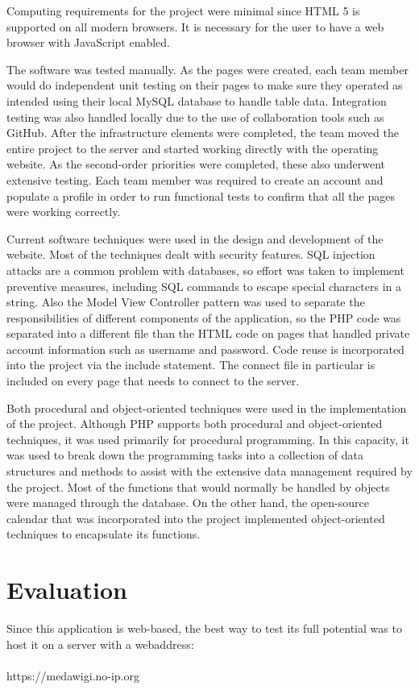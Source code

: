 \documentclass[twocolumn,12pt]{article}
\begin{document}
Computing requirements for the project were minimal since HTML 5 is supported on all modern browsers. It is necessary for the user to have a web browser with JavaScript enabled. 

The software was tested manually. As the pages were created, each team member would do independent unit testing on their pages to make sure they operated as intended using their local MySQL database to handle table data. Integration testing was also handled locally due to the use of collaboration tools such as GitHub. After the infrastructure elements were completed, the team moved the entire project to the server and started working directly with the operating website. As the second-order priorities were completed, these also underwent extensive testing. Each team member was required to create an account and populate a profile in order to run functional tests to confirm that all the pages were working correctly.

Current software techniques were used in the design and development of the website. Most of the techniques dealt with security features. SQL injection attacks are a common problem with databases, so effort was taken to implement preventive measures, including SQL commands to escape special characters in a string. Also the Model View Controller pattern was used to separate the responsibilities of different components of the application, so the PHP code was separated into a different file than the HTML code on pages that handled private account information such as username and password. Code reuse is incorporated into the project via the include statement. The connect file in particular is included on every page that needs to connect to the server.

Both procedural and object-oriented techniques were used in the implementation of the project. Although PHP supports both procedural and object-oriented techniques, it was used primarily for procedural programming. In this capacity, it was used to break down the programming tasks into a collection of data structures and methods to assist with the extensive data management required by the project. Most of the functions that would normally be handled by objects were managed through the database. On the other hand, the open-source calendar that was incorporated into the project implemented object-oriented techniques to encapsulate its functions.

\section{Evaluation}
Since this application is web-based, the best way to test its full potential was to host it on a server with a webaddress: 
\\
\\
\noindent
https://medawigi.no-ip.org
\\
\end{document}
